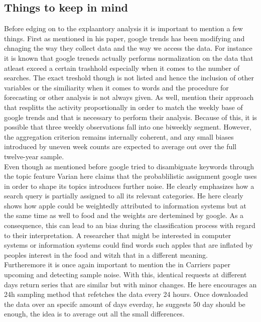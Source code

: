 \documentclass[12pt,a4paper]{article}
\begin{document}
 \subsection{Things to keep in mind}
 Before edging on to the explaantory analysis it is important to mention a few things. First as \cite{Askitas2009} mentioned in his paper, google trends has been modifying and chnaging the way they collect data and the way we access the data. For instance it is known that google treneds actually performs normalization on the data that atleast exceed a certain trashhold especially when it comes to the number of searches. The exact treshold though is not listed and hence the inclusion of other variables or the similiarity when it comes to words and the procedure for forecasting or other analysis is not always given.
 As well, \cite{Askitas2009} mention their approach that resplitts the activity proportionally in order to match the weekly base of google trends and that is necessary to perform their analysis.
Because of this, it is possible that three weekly observations fall into one biweekly segment. 
However, the aggregation criterion remains internally coherent, and any small biases introduced by uneven week counts are expected to average out over the full twelve-year sample.\\
Even though as mentioned before google tried to disambiguate keywords through the topic feature Varian here claims that the probablilistic assignment google uses in order to shape its topics introduces further noise. He clearly emphasizes how a search query is partially assigned to all its relevant categories. He here clearly shows how apple could be weightedly attributed to information systems but at the same time as well to food and the weights are dertemined by google.
As a consequence, this can lead to an bias during the classification process with regard to their interpretation.
A researcher that might be interested in computer systems or information systems could find words such apples that are inflated by peoples interest in the food and witzh that in a different meaning.\\
Furtheremore it is once again important to mention the in Carriers paper upcoming and detecting sample noise. With this, identical requests at different days return series that are similar but with minor changes. 
He here encourages an 24h sampling method that refetches the data every 24 hours. 
Once downloaded the data over an specifc amount of days everday, he suggests 50 day should be enough, the idea is to average out all the small differences. 
\end{document}
